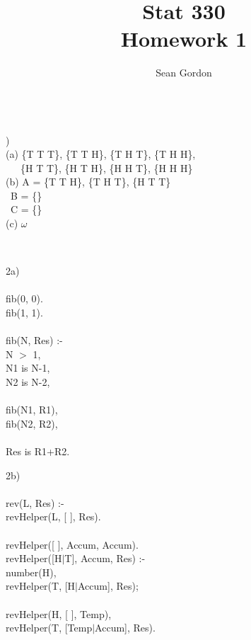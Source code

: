 \documentclass[12pt]{article}
\title{Stat 330\\Homework 1}
\author{Sean Gordon}
\begin{document}
\maketitle


\hrulefill \\

)\\
\indent (a) \{T T T\}, \{T T H\}, \{T H T\}, \{T H H\},\\ \ \ \
\indent \indent  \{H T T\}, \{H T H\}, \{H H T\}, \{H H H\}\\

(b) A = \{T T H\}, \{T H T\}, \{H T T\}\\
\indent \indent \ B = \{\} \\
\indent \indent \ C = \{\} \\

(c) 
$\omega$


\begin{center}
\end{center}


\hrulefill \\


\begin{multicols}{2}

\noindent 2a)\\\\
fib(0, 0).\\
fib(1, 1).\\\\
fib(N, Res) :-\\
\indent N $>$ 1,\\
\indent N1 is N-1,\\
\indent N2 is N-2,\\\\
\indent fib(N1, R1),\\
\indent fib(N2, R2),\\\\
\indent Res is R1+R2.\\

\columnbreak

\noindent 2b)\\\\
rev(L, Res) :-\\
\indent revHelper(L, [ ], Res).\\\\
revHelper([ ], Accum, Accum).\\
revHelper([H$|$T], Accum, Res) :-\\
\indent number(H),\\
\indent revHelper(T, [H$|$Accum], Res);\\\\
\indent revHelper(H, [ ], Temp),\\
\indent revHelper(T, [Temp$|$Accum], Res).\\

\end{multicols} 
\end{document}
